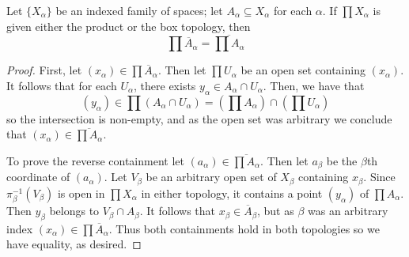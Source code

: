 \documentclass[12pt, a4paper, oneside, openright, titlepage]{book}
\begin{document}
\begin{theorem}
    Let $\{X_{\alpha}\}$ be an indexed family of spaces; let $A_{\alpha} \subseteq X_{\alpha}$ for each $\alpha$. If $\prod X_{\alpha}$ is given either the product or the box topology, then \begin{equation*}
        \prod \overline{A}_{\alpha} = \overline{\prod A_{\alpha}}
    \end{equation*}
\end{theorem}
\begin{proof}
    First, let $(x_{\alpha}) \in \prod \overline{A}_{\alpha}$. Then let $\prod U_{\alpha}$ be an open set containing $(x_{\alpha})$. It follows that for each $U_{\alpha}$, there exists $y_{\alpha} \in A_{\alpha} \cap U_{\alpha}$. Then, we have that $$(y_{\alpha}) \in \prod (A_{\alpha} \cap U_{\alpha}) = \left(\prod A_{\alpha}\right)\cap \left(\prod U_{\alpha}\right)$$
    so the intersection is non-empty, and as the open set was arbitrary we conclude that $(x_{\alpha}) \in \overline{\prod A_{\alpha}}$. 

    To prove the reverse containment let $(a_{\alpha}) \in \overline{\prod A_{\alpha}}$. Then let $a_{\beta}$ be the $\beta$th coordinate of $(a_{\alpha})$. Let $V_{\beta}$ be an arbitrary open set of $X_{\beta}$ containing $x_{\beta}$. Since $\pi^{-1}_{\beta}(V_{\beta})$ is open in $\prod X_{\alpha}$ in either topology, it contains a point $(y_{\alpha})$ of $\prod A_{\alpha}$. Then $y_{\beta}$ belongs to $V_{\beta}\cap A_{\beta}$. It follows that $x_{\beta} \in \overline{A}_{\beta}$, but as $\beta$ was an arbitrary index $(x_{\alpha}) \in \prod \overline{A}_{\alpha}$. Thus both containments hold in both topologies so we have equality, as desired.
\end{proof}
\end{document}
